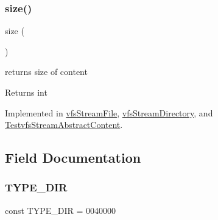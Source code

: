 \mbox{\label{interfaceorg_1_1bovigo_1_1vfs_1_1vfs_stream_content_a775bfb88c1bb7975d67f277eade2a1b7}} 
\subsubsection{\texorpdfstring{size()}{size()}}
{\footnotesize\ttfamily size (\begin{DoxyParamCaption}{ }\end{DoxyParamCaption})}

returns size of content

\begin{DoxyReturn}{Returns}
int 
\end{DoxyReturn}


Implemented in \mbox{\hyperlink{classorg_1_1bovigo_1_1vfs_1_1vfs_stream_file_a775bfb88c1bb7975d67f277eade2a1b7}{vfs\+Stream\+File}}, \mbox{\hyperlink{classorg_1_1bovigo_1_1vfs_1_1vfs_stream_directory_a775bfb88c1bb7975d67f277eade2a1b7}{vfs\+Stream\+Directory}}, and \mbox{\hyperlink{classorg_1_1bovigo_1_1vfs_1_1_testvfs_stream_abstract_content_a775bfb88c1bb7975d67f277eade2a1b7}{Testvfs\+Stream\+Abstract\+Content}}.



\subsection{Field Documentation}
\mbox{\label{interfaceorg_1_1bovigo_1_1vfs_1_1vfs_stream_content_adf0b2f30a2daddc69e41c097fa998e18}} 
\subsubsection{\texorpdfstring{T\+Y\+P\+E\+\_\+\+D\+IR}{TYPE\_DIR}}
{\footnotesize\ttfamily const T\+Y\+P\+E\+\_\+\+D\+IR = 0040000}

